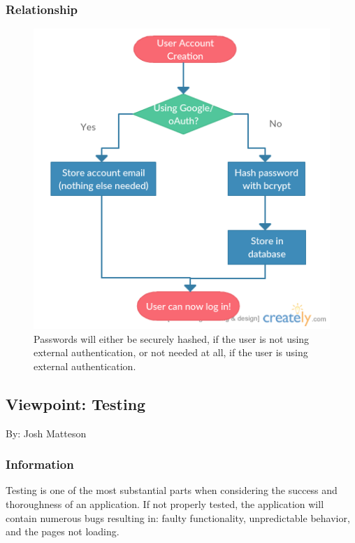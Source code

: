 \documentclass[onecolumn, draftclsnofoot,10pt, compsoc]{IEEEtran}
\begin{document}
\subsubsection{Relationship}
\begin{figure}[ht!]
\centering
\includegraphics[scale=0.5]{password.png}
\caption{Passwords will either be securely hashed, if the user is not using external authentication, or not needed at all, if the user is using external authentication.}
\end{figure}
\pagebreak





\newpage
\subsection{Viewpoint: Testing}
{\noindent By: Josh Matteson \par}

\subsubsection{Information}
\noindent Testing is one of the most substantial parts when considering the 
success and thoroughness of an application. If not properly tested, the 
application will contain numerous bugs resulting in: faulty functionality, 
unpredictable behavior, and the pages not loading. \\
\end{document}
